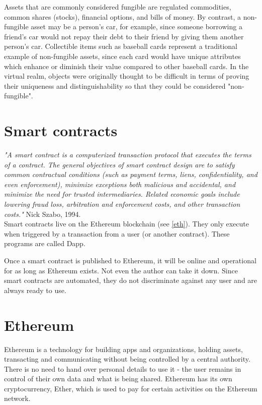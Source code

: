 \documentclass[MSE,Master,english]{twbook}%
\begin{document}
Assets that are commonly considered fungible are regulated commodities, common shares (stocks), financial options, and bills of money. By contrast, a non-fungible asset may be a person's car, for example, since someone borrowing a friend's car would not repay their debt to their friend by giving them another person's car. Collectible items such as baseball cards represent a traditional example of non-fungible assets, since each card would have unique attributes which enhance or diminish their value compared to other baseball cards. In the virtual realm, objects were originally thought to be difficult in terms of proving their uniqueness and distinguishability so that they could be considered "non-fungible".

\section{Smart contracts\label{sm}}
\emph{"A smart contract is a computerized transaction protocol that executes the terms of a contract. The general objectives of smart contract design are to satisfy common contractual conditions (such as payment terms, liens, confidentiality, and even enforcement), minimize exceptions both malicious and accidental, and minimize the need for trusted intermediaries. Related economic goals include lowering fraud loss, arbitration and enforcement costs, and other transaction costs."} Nick Szabo, 1994.\cite{smartContracts} \\

Smart contracts live on the Ethereum blockchain  (see \ref{eth}). They only execute when triggered by a transaction from a user (or another contract). These programs are called \ac{Dapp}.

Once a smart contract is published to Ethereum, it will be online and operational for as long as Ethereum exists. Not even the author can take it down. Since smart contracts are automated, they do not discriminate against any user and are always ready to use.\cite{ethereum}

\section{Ethereum\label{eth}}
Ethereum is a technology for building apps and organizations, holding assets, transacting and communicating without being controlled by a central authority. There is no need to hand over personal details to use it - the user remains in control of their own data and what is being shared. Ethereum has its own cryptocurrency, Ether, which is used to pay for certain activities on the Ethereum network.
\end{document}
